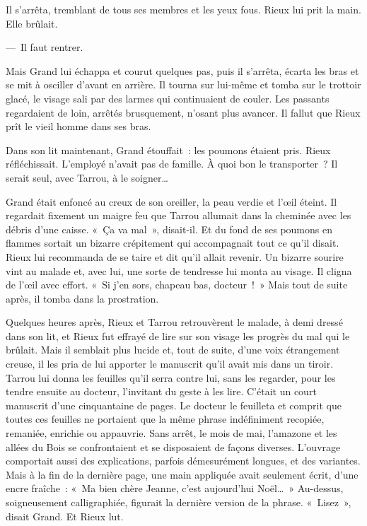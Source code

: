 \documentclass[french,twoside]{book} %
\begin{document}
Il s’arrêta, tremblant de tous ses membres et les yeux fous. Rieux lui prit la main. Elle brûlait.\par
— Il faut rentrer.\par
Mais Grand lui échappa et courut quelques pas, puis il s’arrêta, écarta les bras et se mit à osciller d’avant en arrière. Il tourna sur lui-même et tomba sur le trottoir glacé, le visage sali par des larmes qui continuaient de couler. Les passants regardaient de loin, arrêtés brusquement, n’osant plus avancer. Il fallut que Rieux prît le vieil homme dans ses bras.\par
Dans son lit maintenant, Grand étouffait : les poumons étaient pris. Rieux réfléchissait. L’employé n’avait pas de famille. À quoi bon le transporter ? Il serait seul, avec Tarrou, à le soigner…\par
Grand était enfoncé au creux de son oreiller, la peau verdie et l’œil éteint. Il regardait fixement un maigre feu que Tarrou allumait dans la cheminée avec les débris d’une caisse. « Ça va mal », disait-il. Et du fond de ses poumons en flammes sortait un bizarre crépitement qui accompagnait tout ce qu’il disait. Rieux lui recommanda de se taire et dit qu’il allait revenir. Un bizarre sourire vint au malade et, avec lui, une sorte de tendresse lui monta au visage. Il cligna de l’œil avec effort. « Si j’en sors, chapeau bas, docteur ! » Mais tout de suite après, il tomba dans la prostration.\par
Quelques heures après, Rieux et Tarrou retrouvèrent le malade, à demi dressé dans son lit, et Rieux fut effrayé de lire sur son visage les progrès du mal qui le brûlait. Mais il semblait plus lucide et, tout de suite, d’une voix étrangement creuse, il les pria de lui apporter le manuscrit qu’il avait mis dans un tiroir. Tarrou lui donna les feuilles qu’il serra contre lui, sans les regarder, pour les tendre ensuite au docteur, l’invitant du geste à les lire. C’était un court manuscrit d’une cinquantaine de pages. Le docteur le feuilleta et comprit que toutes ces feuilles ne portaient que la même phrase indéfiniment recopiée, remaniée, enrichie ou appauvrie. Sans arrêt, le mois de mai, l’amazone et les allées du Bois se confrontaient et se disposaient de façons diverses. L’ouvrage comportait aussi des explications, parfois démesurément longues, et des variantes. Mais à la fin de la dernière page, une main appliquée avait seulement écrit, d’une encre fraîche : « Ma bien chère Jeanne, c’est aujourd’hui Noël… » Au-dessus, soigneusement calligraphiée, figurait la dernière version de la phrase. « Lisez », disait Grand. Et Rieux lut.\par
\end{document}
